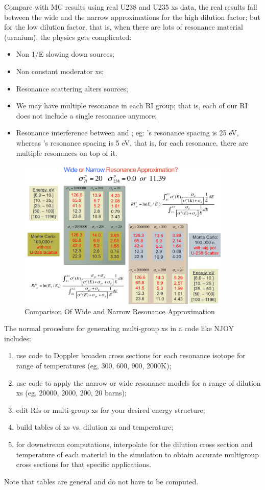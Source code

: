 \documentclass{school-22.211-notes}
\begin{document}
Compare with MC results using real U238 and U235 xs data, the real results fall between the wide and the narrow approximations for the high dilution factor; but for the low dilution factor, that is, when there are lots of resonance material (uranium), the physics gets complicated: 
\begin{itemize}
\item Non 1/E slowing down sources;
\item Non constant moderator xs;
\item Resonance scattering alters sources;
\item We may have multiple resonance in each RI group; that is, each of our RI does not include a single resonance anymore;
\item Resonance interference between  and ; eg: 's resonance spacing is 25 eV, whereas 's resonance spacing is 5 eV, that is, for each  resonance, there are multiple  resonances on top of it. 
\end{itemize}

\begin{figure}
  \centering
  \includegraphics[width=4in]{images/narrow-vs-wide-resonance.png}
  \caption{Comparison Of Wide and Narrow Resonance Approximation} \label{wide-vs-narrow}
\end{figure}


\clearpage
{}
The normal procedure for generating multi-group xs in a code like NJOY includes:
\begin{enumerate}
\item use code to Doppler broaden cross sections for each resonance isotope for range of temperatures (eg, 300, 600, 900, 2000K); 
\item use code to apply the narrow or wide resonance models for a range of dilution xs (eg, 20000, 2000, 200, 20 barns); 
\item edit RIs or multi-group xs for your desired energy structure; 
\item build tables of xs vs. dilution xs and temperature;
\item for downstream computations, interpolate for the dilution cross section and temperature of each material in the simulation to obtain accurate multigroup cross sections for that specific applications. 
\end{enumerate}
Note that tables are general and do not have to be computed. 
\end{document}
